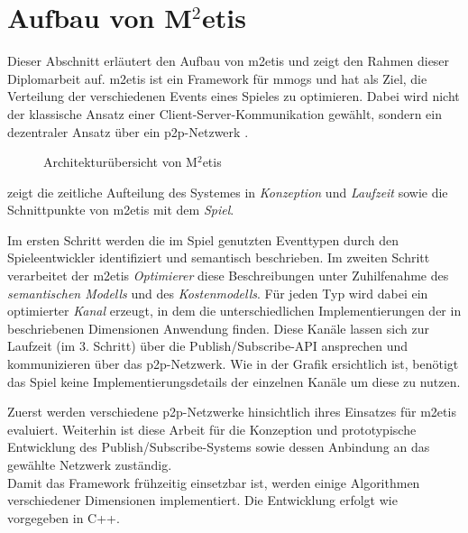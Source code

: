 \section{Aufbau von M$^2$etis}
\label{chap:grundlagen:aufbau_metis}

Dieser Abschnitt erläutert den Aufbau von \ac{m2etis}  und zeigt den Rahmen dieser Diplomarbeit auf. \ac{m2etis} ist ein Framework für \acp{mmog} und hat als Ziel, die Verteilung der verschiedenen Events eines Spieles zu optimieren. Dabei wird nicht der klassische Ansatz einer Client-Server-Kommunikation gewählt, sondern ein dezentraler Ansatz über ein \ac{p2p}-Netzwerk \cite{Fischer2010a, Fischer2010Event}.

\begin{figure}[htbp]
\centering
{}
\caption{Architekturübersicht von M$^2$etis}
\label{fig:metis_aufbau}
\end{figure}

 zeigt die zeitliche Aufteilung des Systemes in \emph{Konzeption} und \emph{Laufzeit} sowie die Schnittpunkte von \ac{m2etis} mit dem \emph{Spiel}.

Im ersten Schritt werden die im Spiel genutzten Eventtypen durch den Spieleentwickler identifiziert und semantisch beschrieben. Im zweiten Schritt verarbeitet der \ac{m2etis} \emph{Optimierer} diese Beschreibungen unter Zuhilfenahme des \emph{semantischen Modells} und des \emph{Kostenmodells}. Für jeden Typ wird dabei ein optimierter \emph{Kanal} erzeugt, in dem die unterschiedlichen Implementierungen der in \cite{Fischer2010a} beschriebenen Dimensionen Anwendung finden. Diese Kanäle lassen sich zur Laufzeit (im 3. Schritt) über die Publish/Subscribe-API ansprechen und kommunizieren über das \ac{p2p}-Netzwerk. Wie in der Grafik ersichtlich ist, benötigt das Spiel keine Implementierungsdetails der einzelnen Kanäle um diese zu nutzen.

Zuerst werden verschiedene \ac{p2p}-Netzwerke hinsichtlich ihres Einsatzes für \ac{m2etis} evaluiert. Weiterhin ist diese Arbeit für die Konzeption und prototypische Entwicklung des Publish/Subscribe-Systems sowie dessen Anbindung an das gewählte Netzwerk zuständig.\\
Damit das Framework frühzeitig einsetzbar ist, werden einige Algorithmen verschiedener Dimensionen implementiert. Die Entwicklung erfolgt wie vorgegeben in C++.
